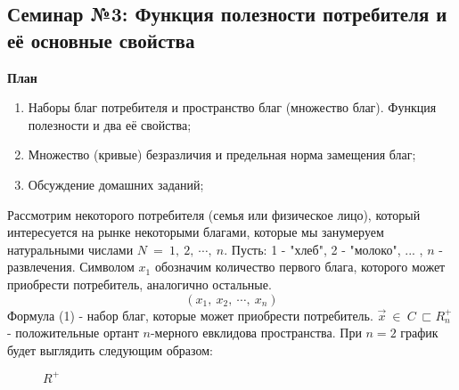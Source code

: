 \documentclass[12pt,a4paper]{article}
\author{GH-TIMe}
\begin{document}
\begin{center}
\section*{Семинар №3: Функция полезности потребителя и её основные свойства}
\textbf{План}
\end{center}

\begin{enumerate}
\item Наборы благ потребителя и пространство благ (множество благ). Функция полезности и два её свойства;
\item Множество (кривые) безразличия и предельная норма замещения благ;
\item Обсуждение домашних заданий;
\end{enumerate}

	Рассмотрим некоторого потребителя (семья или физическое лицо), который интересуется на рынке некоторыми благами, которые мы занумеруем натуральными числами $\displaystyle N\ =\ 1,\ 2,\ \cdots ,\ n$. Пусть: 1 - "хлеб", 2 - "молоко", ... , $\displaystyle n$ - развлечения. Символом $\displaystyle x_{1}$ обозначим количество первого блага, которого может приобрести потребитель, аналогично остальные.
\begin{equation*}
( x_{1} ,\ x_{2} ,\ \cdots ,\ x_{n})
\end{equation*}
	Формула (1) - набор благ, которые может приобрести потребитель. $\displaystyle \vec{x} \ \in \ C\ \sqsubset R^{+}_{n}$ - положительные ортант $\displaystyle n$-мерного евклидова пространства. При $\displaystyle n=2$ график будет выглядить следующим образом:

\begin{figure}[H]

\begin{center}

\end{center}
\caption{$R^+$}
\end{figure}
\end{document}
